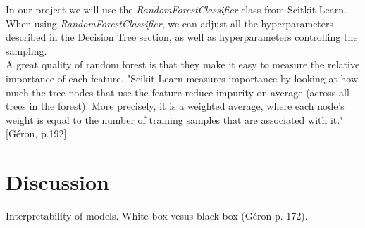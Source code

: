 \documentclass[12pt]{article}
\numberwithin{figure}{section}
\newcommand{\husk}[1]{\color{red} #1 \color{black}}
\begin{document}
In our project we will use the \textit{RandomForestClassifier} class from Scitkit-Learn. When using \textit{RandomForestClassifier}, we can adjust all the hyperparameters described in the Decision Tree section, as well as hyperparameters controlling the sampling.\\
A great quality of random forest is that they make it easy to measure the relative importance of each feature. "Scikit-Learn measures importance by looking at how much the tree nodes that use the feature reduce impurity on average (across all trees in the forest). More precisely, it is a weighted average, where each node's weight is equal to the number of training samples that are associated with it." \husk{[Géron, p.192]} 


\section{Discussion}
Interpretability of models. White box vesus black box (Géron p. 172).
\end{document}
